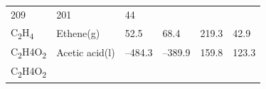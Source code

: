 \documentclass[
  9pt,
]{extbook}
\theoremstyle{definition}
\theoremstyle{definition}
\theoremstyle{definition}
\theoremstyle{remark}
\begin{document}
\begin{longtable}[]{@{}llllll@{}}
\begin{minipage}[t]{0.15\columnwidth}
209\strut
\end{minipage} & \begin{minipage}[t]{0.14\columnwidth}\raggedright
201\strut
\end{minipage} & \begin{minipage}[t]{0.14\columnwidth}\raggedright
44\strut
\end{minipage}\tabularnewline
\begin{minipage}[t]{0.07\columnwidth}\raggedright
C\textsubscript{2}H\textsubscript{4}\strut
\end{minipage} & \begin{minipage}[t]{0.17\columnwidth}\raggedright
Ethene(g)\strut
\end{minipage} & \begin{minipage}[t]{0.15\columnwidth}\raggedright
52.5\strut
\end{minipage} & \begin{minipage}[t]{0.15\columnwidth}\raggedright
68.4\strut
\end{minipage} & \begin{minipage}[t]{0.14\columnwidth}\raggedright
219.3\strut
\end{minipage} & \begin{minipage}[t]{0.14\columnwidth}\raggedright
42.9\strut
\end{minipage}\tabularnewline
\begin{minipage}[t]{0.07\columnwidth}\raggedright
C\textsubscript{2}H4O\textsubscript{2}\strut
\end{minipage} & \begin{minipage}[t]{0.17\columnwidth}\raggedright
Acetic acid(l)\strut
\end{minipage} & \begin{minipage}[t]{0.15\columnwidth}\raggedright
--484.3\strut
\end{minipage} & \begin{minipage}[t]{0.15\columnwidth}\raggedright
--389.9\strut
\end{minipage} & \begin{minipage}[t]{0.14\columnwidth}\raggedright
159.8\strut
\end{minipage} & \begin{minipage}[t]{0.14\columnwidth}\raggedright
123.3\strut
\end{minipage}\tabularnewline
\begin{minipage}[t]{0.07\columnwidth}\raggedright
C\textsubscript{2}H4O\textsubscript{2}\strut
\end{minipage} & \begin{minipage}[t]{0.17\columnwidth}\raggedright

\end{minipage}
\end{longtable}
\end{document}
